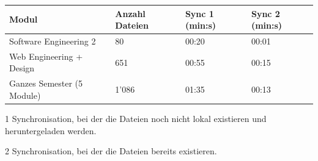 \documentclass[a4paper]{article}
\begin{document}
  \begin{threeparttable}
    \begin{tabulary}{\linewidth}{Llll}
      \toprule
      Modul & Anzahl Dateien & Sync 1 (min:s)  & Sync 2 (min:s)  \\
      \midrule
      Software Engineering 2 & 80 & 00:20 & 00:01 \\
      Web Engineering + Design & 651 & 00:55 & 00:15 \\
      Ganzes Semester (5 Module) & 1'086 & 01:35 & 00:13 \\
      \bottomrule
    \end{tabulary}

    \begin{tablenotes}
      \item[1] Synchronisation, bei der die Dateien noch nicht lokal existieren und heruntergeladen werden.
      \item[2] Synchronisation, bei der die Dateien bereits existieren.
    \end{tablenotes}
  \end{threeparttable}
\end{document}
